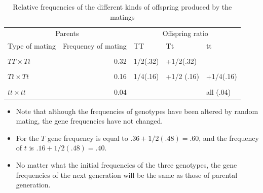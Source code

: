 \documentclass[11pt,dvipsnames,ignorenonframetext,aspectratio=169]{beamer}
\providecommand{\tightlist}{%
  \setlength{\itemsep}{0pt}\setlength{\parskip}{0pt}}
\begin{document}
\begin{frame}{}
\protect\hypertarget{section-17}{}
\begin{table}

\caption{\label{tab:unnamed-chunk-1}Relative frequencies of the different kinds of offspring produced by the matings}
\centering
\begin{tabular}[t]{lrlll}
\toprule
\multicolumn{2}{c}{Parents} & \multicolumn{3}{c}{Offspring ratio} \\
\cmidrule(l{3pt}r{3pt}){1-2} \cmidrule(l{3pt}r{3pt}){3-5}
Type of mating & Frequency of mating & TT & Tt & tt\\
\midrule
\cellcolor{gray!6}{$TT \times TT$} & \cellcolor{gray!6}{0.16} & \cellcolor{gray!6}{all(.16)} & \cellcolor{gray!6}{} & \cellcolor{gray!6}{}\\
$TT \times Tt$ & 0.32 & 1/2(.32) & +1/2(.32) & \\
\cellcolor{gray!6}{$TT \times tt$} & \cellcolor{gray!6}{0.16} & \cellcolor{gray!6}{} & \cellcolor{gray!6}{all (.16)} & \cellcolor{gray!6}{}\\
$Tt \times Tt$ & 0.16 & 1/4(.16) & +1/2 (.16) & +1/4(.16)\\
\cellcolor{gray!6}{$Tt \times tt$} & \cellcolor{gray!6}{0.16} & \cellcolor{gray!6}{} & \cellcolor{gray!6}{1/2(.16)} & \cellcolor{gray!6}{+1/2(.16)}\\
\addlinespace
$tt \times tt$ & 0.04 &  &  & all (.04)\\
\bottomrule
\end{tabular}
\end{table}
\end{frame}

\begin{frame}{}
\protect\hypertarget{section-18}{}
\begin{itemize}
\tightlist
\item
  Note that although the frequencies of genotypes have been altered by
  random mating, the gene frequencies have not changed.
\item
  For the \(T\) gene frequency is equal to \(.36 + 1/2(.48) = .60\), and
  the frequency of \(t\) is \(.16 + 1/2(.48) = .40\).
\item
  No matter what the initial frequencies of the three genotypes, the
  gene frequencies of the next generation will be the same as those of
  parental generation.
\end{itemize}
\end{frame}
\end{document}

